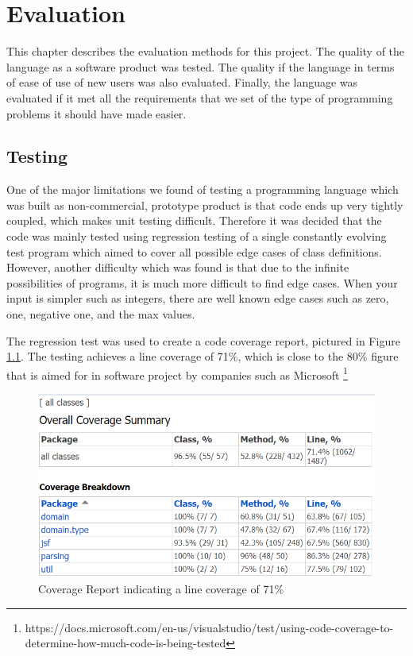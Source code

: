 \documentclass{l4proj}
\begin{document}

\chapter{Evaluation}

This chapter describes the evaluation methods for this project.
The quality of the language as a software product was tested.
The quality if the language in terms of ease of use of new users was also evaluated.
Finally, the language was evaluated if it met all the requirements that we set of the type of programming problems it should have made easier.

\section{Testing}

One of the major limitations we found of testing a programming language which was built as non-commercial, prototype product is that code ends up very tightly coupled, which makes unit testing difficult.
Therefore it was decided that the code was mainly tested using regression testing of a single constantly evolving test program which aimed to cover all possible edge cases of class definitions.
However, another difficulty which was found is that due to the infinite possibilities of programs, it is much more difficult to find edge cases.
When your input is simpler such as integers, there are well known edge cases such as zero, one, negative one, and the max values.

The regression test was used to create a code coverage report, pictured in Figure \ref{fig:coverage}. The testing achieves a line coverage of 71\%, which is close to the 80\% figure that is aimed for in software project by companies such as Microsoft \footnote{https://docs.microsoft.com/en-us/visualstudio/test/using-code-coverage-to-determine-how-much-code-is-being-tested}

\begin{figure}[H]
    \label{fig:coverage}
    \centering
    \includegraphics[width=0.7\linewidth]{images/coverage.png}
    \caption{Coverage Report indicating a line coverage of 71\%}
\end{figure}
\end{document}
